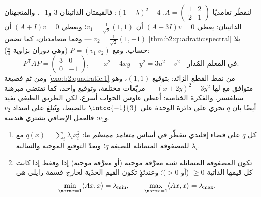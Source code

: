 \begin{example}\label{ex:b2:quadratic:fullrun}
لنقطّر تعامديًا $A = \begin{pmatrix} 1 & 2\\ 2 &
1\end{pmatrix}$.  $(1 - \lambda)^2 -
4$: فالقيمتان الذاتيتان $3$ و$-1$. والمتجهتان الذاتيتان: يعطي $(A - 3I)v = 0$
أن $v_1 = \frac{1}{\sqrt2}(1,1)$؛ ويعطي $(A + I)v = 0$ أن $v_2
= \frac{1}{\sqrt2}(1,-1)$ --- وهما متعامدتان، كما
تضمن \cref{thm:b2:quadratic:spectral} بلا
حساب. ومع $P = (v_1\ v_2)$ (وهي دوران بزاوية
$\frac\pi4$):
\[
P^{\mathsf T}AP = \begin{pmatrix} 3 & 0\\ 0 & -1
\end{pmatrix},
\qquad
x^2 + 4xy + y^2 = 3u^2 - v^2
\quad\text{في المعلم المُدار} .
\]
ومن ثم فصيغة \cref{exo:b2:quadratic:1} من نمط
القطع الزائد: بتوقيع $(1,1)$، وهو متوافق مع  لها
$(x + 2y)^2 - 3y^2$ --- مربّعات مختلفة، وتوقيع واحد، كما
تقتضي مبرهنة سيلفستر. والفكرة الختامية: أعطى غاوس الجواب
أسرع، لكن الطريق الطيفي يفيد أيضًا بأن $q$ تجري على دائرة
الوحدة على $\intcc{-1}{3}$ بالضبط، وتُبلغ على امتداد
$v_2$ و$v_1$: فالعمل الإضافي يشتري هندسة.
\end{example}

\begin{corollary}\label{cor:b2:quadratic:principalaxes}
\begin{enumerate}
  \item كل  $q$ على فضاء إقليدي تتقطّر
        في أساس \emph{متعامد ممنظم} ما: $q(x) = \sum_i \lambda_i
        x_i^2$ مع $\lambda_i$  للمصفوفة المتماثلة
        للصيغة $q$؛ ويعدّ التوقيع  الموجبة والسالبة.
  \item تكون المصفوفة المتماثلة شبه معرَّفة موجبة (أو
        معرَّفة موجبة) إذا وفقط إذا كانت كل قيمها الذاتية $\geq 0$ (أو $>
        0$)؛ وعندئذٍ تكون القيم الحدّية لخارج قسمة رايلي
        هي
        \[
        \min_{\norm x = 1} \langle Ax, x\rangle = \lambda_{\min},
        \qquad
        \max_{\norm x = 1} \langle Ax, x\rangle = \lambda_{\max} .
        \]
\end{enumerate}
\end{corollary}

